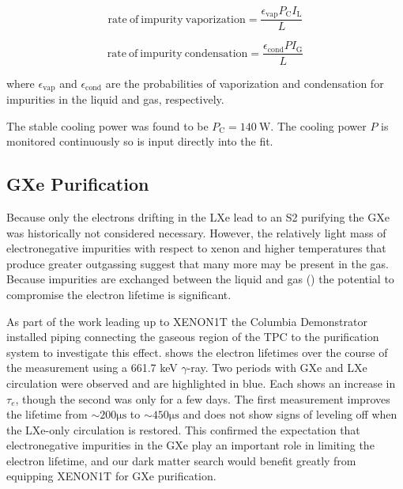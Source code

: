 \begin{equation}
\mathrm{rate\ of\ impurity\ vaporization} = \frac{\epsilon_{\mathrm{vap}} P_{\mathrm{C}} I_{\mathrm{L}}}{L}
\end{equation}

\begin{equation}
\mathrm{rate\ of\ impurity\ condensation} = \frac{\epsilon_{\mathrm{cond}} P I_{\mathrm{G}}}{L}
\end{equation}

\noindent where $\epsilon_{\mathrm{vap}}$ and $\epsilon_{\mathrm{cond}}$ are the probabilities of vaporization and condensation for
impurities in the liquid and gas, respectively.

The stable cooling power was found to be $P_{\mathrm{C}} = 140\ \mathrm{W}$.  The cooling power $P$ is monitored continuously so is input
directly into the fit.



\subsection{GXe Purification}
\label{subsec:electron_lifetime_model_gxe}
Because only the electrons drifting in the LXe lead to an S2 purifying the GXe was historically not considered necessary.  However,
the relatively light mass of electronegative impurities with respect to xenon and higher temperatures that produce greater outgassing
suggest that many more may be present in the gas.  Because
impurities are exchanged between the liquid and gas () the potential to compromise
the electron lifetime is significant.

As part of the work leading up to XENON1T the Columbia Demonstrator installed piping connecting the gaseous region of the TPC to the
purification system to investigate this effect.   shows the electron lifetimes over
the course of the measurement using a  661.7 keV $\gamma$-ray.  Two periods with GXe and LXe circulation were observed and
are highlighted in blue.  Each shows an increase in
$\tau_e$, though the second was only for a few days.  The first measurement improves the lifetime from
${\sim} 200 \mathrm{\mu s}$ to ${\sim} 450 \mathrm{\mu s}$ and does not show signs of leveling off when the LXe-only circulation is
restored.  This confirmed the expectation that electronegative impurities in the GXe play an important role in limiting the electron
lifetime, and our dark matter search would benefit greatly from equipping XENON1T for GXe purification.

